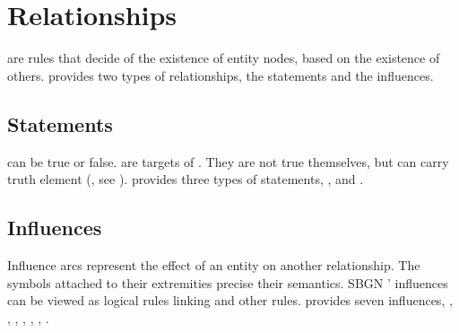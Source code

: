 \section{Relationships}\label{sec:relationships}

 are rules that decide of the existence of entity nodes, based on the existence of others. 
\SBGNERLone{} provides two types of relationships, the statements and the influences.


\subsection{Statements}\label{sec:statements}

 can be true or false.  are targets of . They are not true themselves, but can carry truth element (, see ). \SBGNERLone{} provides three types of statements, ,  and .



%


\subsection{Influences}\label{sec:influences}

Influence arcs represent the effect of an entity on another relationship. The symbols attached to their extremities precise their semantics. SBGN \ERs{}' influences can be viewed as logical rules linking  and other rules. \SBGNERLone{} provides seven influences, , , , , , , .









